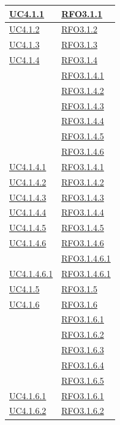 \begin{longtable}{|>{\centering}m{5cm}|m{5cm}<{\centering}|}
\hyperref[UC4.1.1]{UC4.1.1} & \hyperlink{RFO3.1.1}{RFO3.1.1}\\ \hline
\hyperref[UC4.1.2]{UC4.1.2} & \hyperlink{RFO3.1.2}{RFO3.1.2}\\ \hline
\hyperref[UC4.1.3]{UC4.1.3} & \hyperlink{RFO3.1.3}{RFO3.1.3}\\ \hline
\hyperref[UC4.1.4]{UC4.1.4} & \hyperlink{RFO3.1.4}{RFO3.1.4}\\
& \hyperlink{RFO3.1.4.1}{RFO3.1.4.1}\\
& \hyperlink{RFO3.1.4.2}{RFO3.1.4.2}\\
& \hyperlink{RFO3.1.4.3}{RFO3.1.4.3}\\
& \hyperlink{RFO3.1.4.4}{RFO3.1.4.4}\\
& \hyperlink{RFO3.1.4.5}{RFO3.1.4.5}\\
& \hyperlink{RFO3.1.4.6}{RFO3.1.4.6}\\ \hline
\hyperref[UC4.1.4.1]{UC4.1.4.1} & \hyperlink{RFO3.1.4.1}{RFO3.1.4.1}\\ \hline
\hyperref[UC4.1.4.2]{UC4.1.4.2} & \hyperlink{RFO3.1.4.2}{RFO3.1.4.2}\\ \hline
\hyperref[UC4.1.4.3]{UC4.1.4.3} & \hyperlink{RFO3.1.4.3}{RFO3.1.4.3}\\ \hline
\hyperref[UC4.1.4.4]{UC4.1.4.4} & \hyperlink{RFO3.1.4.4}{RFO3.1.4.4}\\ \hline
\hyperref[UC4.1.4.5]{UC4.1.4.5} & \hyperlink{RFO3.1.4.5}{RFO3.1.4.5}\\ \hline
\hyperref[UC4.1.4.6]{UC4.1.4.6} & \hyperlink{RFO3.1.4.6}{RFO3.1.4.6}\\
& \hyperlink{RFO3.1.4.6.1}{RFO3.1.4.6.1}\\ \hline
\hyperref[UC4.1.4.6.1]{UC4.1.4.6.1} & \hyperlink{RFO3.1.4.6.1}{RFO3.1.4.6.1}\\ \hline
\hyperref[UC4.1.5]{UC4.1.5} & \hyperlink{RFO3.1.5}{RFO3.1.5}\\ \hline
\hyperref[UC4.1.6]{UC4.1.6} & \hyperlink{RFO3.1.6}{RFO3.1.6}\\
& \hyperlink{RFO3.1.6.1}{RFO3.1.6.1}\\
& \hyperlink{RFO3.1.6.2}{RFO3.1.6.2}\\
& \hyperlink{RFO3.1.6.3}{RFO3.1.6.3}\\
& \hyperlink{RFO3.1.6.4}{RFO3.1.6.4}\\
& \hyperlink{RFO3.1.6.5}{RFO3.1.6.5}\\ \hline
\hyperref[UC4.1.6.1]{UC4.1.6.1} & \hyperlink{RFO3.1.6.1}{RFO3.1.6.1}\\ \hline
\hyperref[UC4.1.6.2]{UC4.1.6.2} & \hyperlink{RFO3.1.6.2}{RFO3.1.6.2}\\ \hline

\end{longtable}

